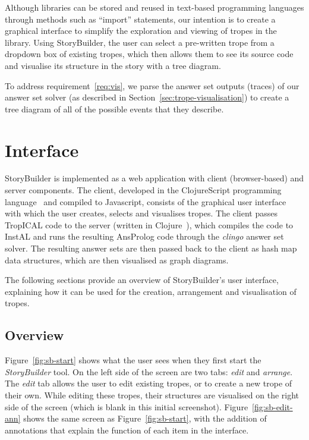 \documentclass[11pt]{report}
\begin{document}
Although libraries can be stored and reused in text-based programming languages
through methods such as ``import'' statements, our intention is to create a
graphical interface to simplify the exploration and viewing of tropes in the
library. Using StoryBuilder, the user can select a pre-written trope from a
dropdown box of existing tropes, which then allows them to see its source code
and visualise its structure in the story with a tree diagram.

To address requirement~\ref{req:vis}, we parse the answer set outputs (traces)
of our answer set solver (as described in Section~\ref{sec:trope-visualisation}) to create a tree
diagram of all of the possible events that they describe.

\section{Interface}

StoryBuilder is implemented as a web application with client (browser-based)
and server components. The client, developed in the ClojureScript programming
language~\citep{clojurescript} and compiled to Javascript, consists of the graphical user interface
with which the user creates, selects and visualises tropes. The client passes
TropICAL code to the server (written in Clojure~\citep{clojure}), which compiles
the code to InstAL and runs the resulting AnsProlog code through the
\emph{clingo} answer set solver. The resulting answer sets are then passed back
to the client as hash map data structures, which are then visualised as graph diagrams.

The following sections provide an overview of StoryBuilder's user interface,
explaining how it can be used for the creation, arrangement and visualisation of tropes.

\subsection{Overview}

Figure~\ref{fig:sb-start} shows what the user sees when they first start the
\emph{StoryBuilder} tool. On the left side of the screen are two tabs:
\emph{edit} and \emph{arrange}. The \emph{edit} tab allows the user to edit
existing tropes, or to create a new trope of their own. While editing these
tropes, their structures are visualised on the right side of the screen (which
is blank in this initial screenshot). Figure~\ref{fig:sb-edit-ann} shows the
same screen as Figure~\ref{fig:sb-start}, with the addition of annotations that
explain the function of each item in the interface.
\end{document}
